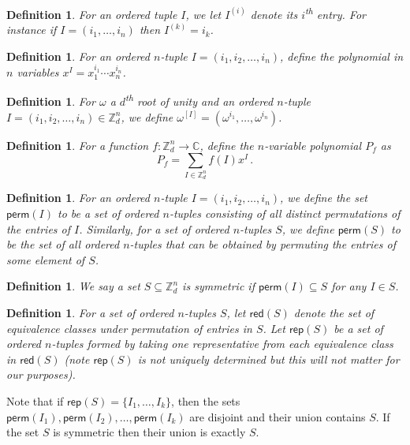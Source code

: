 \documentclass{toc}
\newtheorem{define}[theorem]{Definition}
\renewcommand\Z{{\mathbb{Z}}}
\renewcommand\C{{\mathbb{C}}}
\newcommand\perm{\textsf{perm}}
\newcommand\rep{\textsf{rep}}
\newcommand\red{\textsf{red}}
\newcommand{\ts}{\textsuperscript}
\begin{document}
\begin{define}
For an ordered tuple $I$, %
%
we let $I^{(i)}$ denote its $i$\ts{th} entry.  
For instance if $I = (i_1, \dots, i_n)$ then $I^{(k)} = i_k$.
\end{define}


\begin{define}\label{def:tupleexponent}
For an ordered $n$-tuple $I = (i_1,i_2, \dots ,i_n)$, define the polynomial
%
in    %
$n$ variables $x^I = x_1^{i_1} \cdots x_n^{i_n}$.
\end{define}

\begin{define}
For $\omega$ a $d$\ts{th} root of unity and an ordered $n$-tuple $I = (i_1,i_2, \dots ,i_n) \in \Z_d^n$, we define $\omega^{[I]} = (\omega^{i_1}, \dots , \omega^{i_n})$.

\end{define}

\begin{define}
For a function $f: \Z_d^n \rightarrow \C$, define the $n$-variable polynomial $P_f$ as 
\[
P_f = \sum_{I \in \Z_d^n} f(I)x^I \,.
\]
\end{define}



\begin{define}
For an ordered $n$-tuple $I = (i_1,i_2, \dots ,i_n)$, we define the set $\perm(I)$ to be a set of ordered $n$-tuples consisting of all distinct permutations of the entries of $I$.  Similarly, for a set of ordered $n$-tuples $S$, we define $\perm(S)$ to be the set of all ordered $n$-tuples that can be obtained by permuting the entries of some element of $S$.
\end{define}

\begin{define}
We say a set $S \subseteq \Z_d^n$ is symmetric if %
$\perm(I) \subseteq S$ for any $I \in S$. %
%
\end{define}

\begin{define}
For a set of ordered $n$-tuples $S$, let $\red(S)$ denote the set of equivalence classes under permutation of entries in $S$.  Let $\rep(S)$ be a set of ordered $n$-tuples formed by taking one representative from each equivalence class in $\red(S)$ (note $\rep(S)$ is not uniquely determined but this will not matter for our purposes).  
\end{define}
Note that if $\rep(S) = \{I_1, \dots , I_k \}$, then the sets $\perm(I_1), \perm(I_2), \dots , \perm(I_k)$ are disjoint and their union contains $S$.  If the set $S$ is symmetric then their union is exactly $S$.
\end{document}
